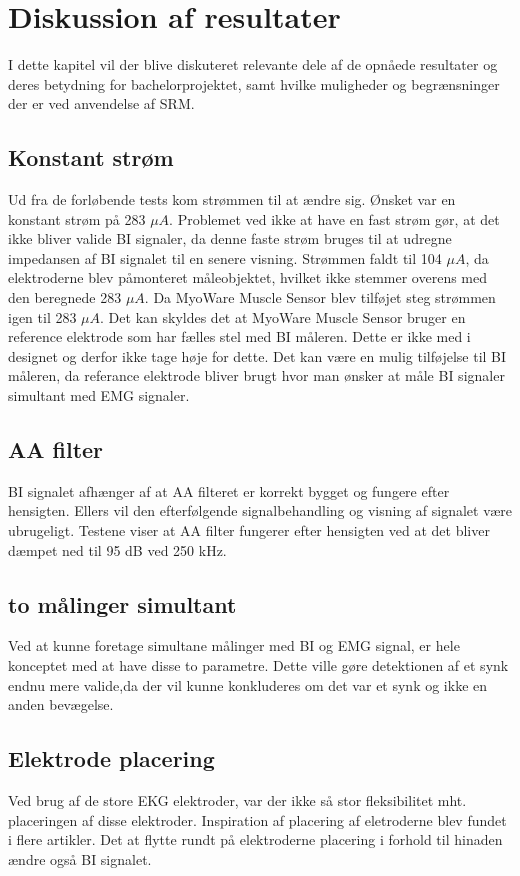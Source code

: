 \chapter{Diskussion af resultater}

I dette kapitel vil der blive diskuteret relevante dele af de opnåede resultater og deres betydning for bachelorprojektet, samt hvilke muligheder og begrænsninger der er ved anvendelse af SRM. 

\section{Konstant strøm}
Ud fra de forløbende tests kom strømmen til at ændre sig. Ønsket var en konstant strøm på 283 $\mu A$. Problemet ved ikke at have en fast strøm gør, at det ikke bliver valide BI signaler, da denne faste strøm bruges til at udregne impedansen af BI signalet til en senere visning. Strømmen faldt til 104 $\mu A$, da elektroderne blev påmonteret måleobjektet, hvilket ikke stemmer overens med den beregnede 283 $\mu A$. Da MyoWare Muscle Sensor blev tilføjet steg strømmen igen til 283 $\mu A$. Det kan skyldes det at MyoWare Muscle Sensor bruger en reference elektrode som har fælles stel med BI måleren. Dette er ikke med i designet og derfor ikke tage høje for dette. Det kan være en mulig tilføjelse til BI måleren, da referance elektrode bliver brugt hvor man ønsker at måle BI signaler simultant med EMG signaler\cite{Nahrstaedt2012a}. 

\section{AA filter}
BI signalet afhænger af at AA filteret er korrekt bygget og fungere efter hensigten. Ellers vil den efterfølgende signalbehandling og visning af signalet være ubrugeligt. Testene viser at AA filter fungerer efter hensigten ved at det bliver dæmpet ned til 95 dB ved 250 kHz. 

\section{to målinger simultant}
Ved at kunne foretage simultane målinger med BI og EMG signal, er hele konceptet med at have disse to parametre. Dette ville gøre detektionen af et synk endnu mere valide,da der vil kunne konkluderes om det var et synk og ikke en anden bevægelse. 



\section{Elektrode placering}
Ved brug af de store EKG elektroder, var der ikke så stor fleksibilitet mht. placeringen af disse elektroder. Inspiration af placering af eletroderne blev fundet i flere artikler.\cite{Chester}
\cite{Schultheiss2013} Det at flytte rundt på elektroderne placering i forhold til hinaden ændre også BI signalet\cite{Yamamoto2000}.  



